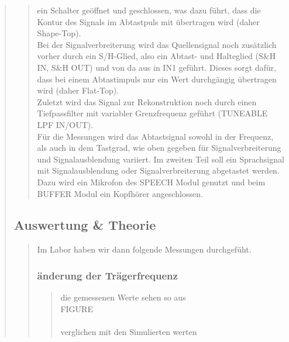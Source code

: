 \begin{quote}
\begin{quote}
     ein Schalter geöffnet und geschlossen, was dazu führt, dass die Kontur
     des Signals im Abtastpuls mit übertragen wird (daher Shape-Top).\\
     Bei der Signalverbreiterung wird das Quellensignal noch zusätzlich vorher
     durch ein S/H-Glied, also ein Abtast- und Halteglied (S&H
     IN, S&H OUT) und von da aus in IN1 geführt. Dieses sorgt dafür, dass bei
     einem Abtastimpuls nur ein Wert durchgängig übertragen wird (daher
     Flat-Top).\\ 
     \noindent\hspace*{4mm}%
     Zuletzt wird das Signal zur Rekonstruktion noch durch einen Tiefpassfilter
     mit variabler Grenzfrequenz geführt (TUNEABLE LPF IN/OUT).\\
     \noindent\hspace*{4mm}%
     Für die Messungen wird das Abtastsignal sowohl in der Frequenz, als auch in
     dem Tastgrad, wie oben gegeben für Signalverbreiterung und
     Signalausblendung variiert.
     Im zweiten Teil soll ein Sprachsignal mit Signalausblendung oder
     Signalverbreiterung abgetastet werden. Dazu wird ein Mikrofon des SPEECH
     Modul genutzt und beim BUFFER Modul ein Kopfhörer angeschlossen.
    \end{quote}
    
    
    \subsection{Auswertung \& Theorie}
    \begin{quote}
        
        Im Labor haben wir dann folgende Messungen durchgefüht.
        
        
        \subsubsection{änderung der Trägerfrequenz}
        \begin{quote}
            
            die gemessenen Werte sehen so aus\\
            
            FIGURE\\
            \\
            
            
            verglichen mit den Simulierten werten\\
            

\end{quote}
\end{quote}
\end{quote}
